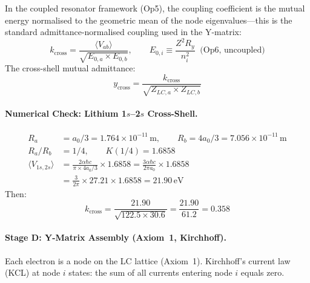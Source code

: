 In the coupled resonator framework (Op5), the coupling
coefficient is the mutual energy normalised to the geometric
mean of the node eigenvalues---this is the standard
admittance-normalised coupling used in the Y-matrix:\begin{equation}
    k_{\text{cross}} = \frac{\langle V_{ab} \rangle}
    {\sqrt{E_{0,a} \times E_{0,b}}}, \qquad
    E_{0,i} \equiv \frac{Z^2 R_y}{n_i^2}
    \;\;\text{(Op6, uncoupled)}
    \label{eq:k_cross}
\end{equation}
The cross-shell mutual admittance:
\begin{equation}
    y_{\text{cross}} = \frac{k_{\text{cross}}}
    {\sqrt{Z_{LC,a} \times Z_{LC,b}}}
    \label{eq:y_cross}
\end{equation}

\paragraph{Numerical Check: Lithium 1$s$--2$s$ Cross-Shell.}
\begin{align}
    R_a &= a_0/3 = 1.764 \times 10^{-11}\,\text{m}, \qquad
    R_b = 4a_0/3 = 7.056 \times 10^{-11}\,\text{m} \nonumber \\
    R_a/R_b &= 1/4, \qquad K(1/4) = 1.6858 \nonumber \\
    \langle V_{1s,2s} \rangle
    &= \frac{2\alpha\hbar c}{\pi \times 4a_0/3} \times 1.6858
    = \frac{3\alpha\hbar c}{2\pi a_0} \times 1.6858
    \nonumber \\
    &= \frac{3}{2\pi} \times 27.21 \times 1.6858
    = 21.90\,\text{eV}
    \label{eq:li_cross_shell_energy}
\end{align}
Then:
\begin{equation}
    k_{\text{cross}} = \frac{21.90}{\sqrt{122.5 \times 30.6}}
    = \frac{21.90}{61.2} = 0.358
\end{equation}

\paragraph{Stage D: Y-Matrix Assembly (Axiom~1, Kirchhoff).}

Each electron is a node on the LC lattice (Axiom~1).
Kirchhoff's current law (KCL) at node $i$ states:
the sum of all currents entering node $i$ equals zero.

